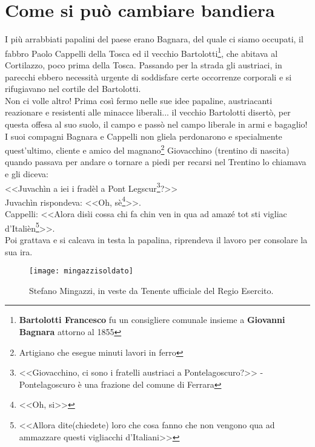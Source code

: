 
\chapter{Come si può cambiare bandiera}
I più arrabbiati papalini del paese erano Bagnara, del quale ci siamo occupati, il fabbro Paolo Cappelli della Tosca ed il vecchio Bartolotti\footnote{\textbf{Bartolotti Francesco} fu un consigliere comunale insieme a \textbf{Giovanni Bagnara} attorno al 1855}, che abitava al Cortilazzo, poco prima della Tosca. Passando per la strada gli austriaci, in parecchi ebbero necessità urgente di soddisfare certe occorrenze corporali e si rifugiavano nel cortile del Bartolotti.\\
\indent Non ci volle altro! Prima così fermo nelle sue idee papaline, austriacanti reazionare e resistenti alle minacce liberali... il vecchio Bartolotti disertò, per questa offesa al suo suolo, il campo e passò nel campo liberale in armi e bagaglio!\\
\indent I suoi compagni Bagnara e Cappelli non gliela perdonarono e specialmente quest'ultimo, cliente e amico del magnano\footnote{Artigiano che esegue minuti lavori in ferro} Giovacchino (trentino di nascita) quando passava per andare o tornare a piedi per recarsi nel Trentino lo chiamava e gli diceva:\\
\indent <<Juvachìn a iei i fradèl a Pont Legscur\footnote{<<Giovacchino, ci sono i fratelli austriaci a Pontelagoscuro?>> - Pontelagoscuro è una frazione del comune di Ferrara}?>>\\
\indent Juvachìn rispondeva: <<Oh, sè\footnote{<<Oh, si>>}>>.\\
\indent {}Cappelli: <<Alora disìi cossa chi fa chin ven in qua ad amazé tot sti vigliac d'Italièn\footnote{<<Allora dite(chiedete) loro che cosa fanno che non vengono qua ad ammazzare questi vigliacchi d'Italiani>>}>>.\\
\indent Poi grattava e si calcava in testa la papalina, riprendeva il lavoro per consolare la sua ira.

 \begin{figure}[htb]
    \centering
    \texttt{[image: mingazzisoldato]}
    \caption[Stefano Mingazzi in divisa militare]{Stefano Mingazzi, in veste da Tenente ufficiale del Regio Esercito.\label{fig:mingazzisoldato}}
    \vspace{-0.8cm}
\end{figure}
